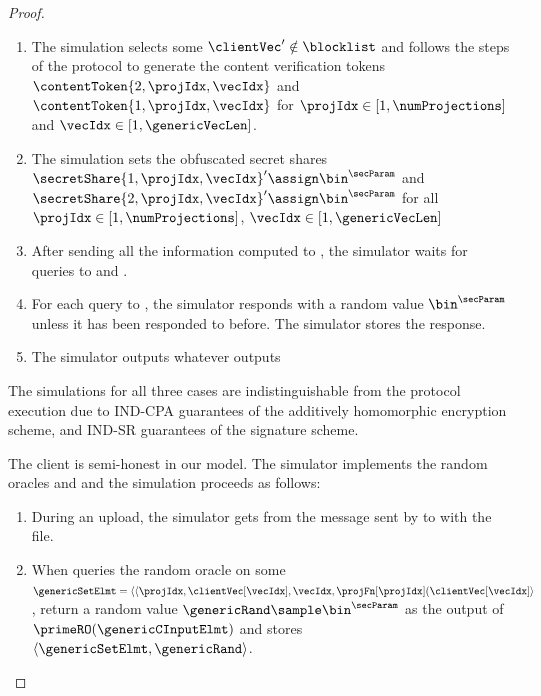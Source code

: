 \begin{proof}
\begin{enumerate}
\item The simulation selects some $\clientVec' \notin \blocklist$ and follows the steps of the protocol to generate the content verification tokens $\contentToken{2, \projIdx, \vecIdx}$ and $\contentToken{1, \projIdx, \vecIdx}$ for $\projIdx \in [1, \numProjections]$ and $\vecIdx \in [1, \genericVecLen]$.  

\item The simulation sets the obfuscated secret shares $\secretShare{1, \projIdx, \vecIdx}' \assign \bin^{\secParam}$ and $\secretShare{2, \projIdx, \vecIdx}' \assign \bin^{\secParam}$ for all $\projIdx \in [1, \numProjections]$, $\vecIdx \in [1, \genericVecLen]$


\item After sending all the information computed to \server, the simulator waits for queries to \primeRO and \ro. 

\item For each query to \ro, the simulator responds with a random value $\bin^{\secParam}$ unless it has been responded to before. The simulator stores the response. 


\item The simulator outputs whatever \server outputs
\end{enumerate}
 



The simulations for all three cases are indistinguishable from the protocol execution due to IND-CPA guarantees of the additively homomorphic encryption scheme, and IND-SR guarantees of the signature scheme. 








\iffalse 
The client is semi-honest in our model. The simulator implements the random oracles \primeRO and \ro and the simulation proceeds as follows: 

\begin{enumerate}
\item During an upload, the simulator gets \genericFileID from the message sent by \client to \server with the file.  
\item When \client queries the random oracle \primeRO on some $\genericSetElmt = \langle \langle \projIdx, \clientVec[\vecIdx], \vecIdx, \projFn[\projIdx](\clientVec[\vecIdx] \rangle$, 
return a random value $\genericRand \sample \bin^{\secParam}$ as the output of $\primeRO(\genericCInputElmt)$ and stores $\langle \genericSetElmt, \genericRand \rangle$.


\end{enumerate}
\end{proof}

